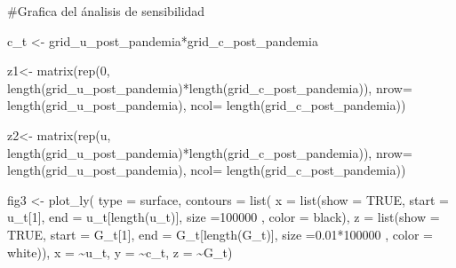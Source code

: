 \documentclass[
  us-letterpaper,
]{scrreprt}
\newenvironment{Shaded}{\begin{snugshade}}{\end{snugshade}}
\newcommand{\AttributeTok}[1]{\textcolor[rgb]{0.40,0.45,0.13}{#1}}
\newcommand{\CommentTok}[1]{\textcolor[rgb]{0.37,0.37,0.37}{#1}}
\newcommand{\ConstantTok}[1]{\textcolor[rgb]{0.56,0.35,0.01}{#1}}
\newcommand{\DecValTok}[1]{\textcolor[rgb]{0.68,0.00,0.00}{#1}}
\newcommand{\FloatTok}[1]{\textcolor[rgb]{0.68,0.00,0.00}{#1}}
\newcommand{\FunctionTok}[1]{\textcolor[rgb]{0.28,0.35,0.67}{#1}}
\newcommand{\NormalTok}[1]{\textcolor[rgb]{0.00,0.23,0.31}{#1}}
\newcommand{\OtherTok}[1]{\textcolor[rgb]{0.00,0.23,0.31}{#1}}
\newcommand{\SpecialCharTok}[1]{\textcolor[rgb]{0.37,0.37,0.37}{#1}}
\newcommand{\StringTok}[1]{\textcolor[rgb]{0.13,0.47,0.30}{#1}}
\theoremstyle{plain}
\theoremstyle{plain}
\theoremstyle{definition}
\theoremstyle{remark}
\begin{document}
\begin{Shaded}
\begin{Highlighting}[]
\CommentTok{\#Grafica del ánalisis de sensibilidad}

\NormalTok{c\_t }\OtherTok{\textless{}{-}}\NormalTok{ grid\_u\_post\_pandemia}\SpecialCharTok{*}\NormalTok{grid\_c\_post\_pandemia}

\NormalTok{z1}\OtherTok{\textless{}{-}} \FunctionTok{matrix}\NormalTok{(}\FunctionTok{rep}\NormalTok{(}\DecValTok{0}\NormalTok{,}
\FunctionTok{length}\NormalTok{(grid\_u\_post\_pandemia)}\SpecialCharTok{*}\FunctionTok{length}\NormalTok{(grid\_c\_post\_pandemia)), }\AttributeTok{nrow=}
\FunctionTok{length}\NormalTok{(grid\_u\_post\_pandemia), }\AttributeTok{ncol=} \FunctionTok{length}\NormalTok{(grid\_c\_post\_pandemia))}

\NormalTok{z2}\OtherTok{\textless{}{-}} \FunctionTok{matrix}\NormalTok{(}\FunctionTok{rep}\NormalTok{(u,}
\FunctionTok{length}\NormalTok{(grid\_u\_post\_pandemia)}\SpecialCharTok{*}\FunctionTok{length}\NormalTok{(grid\_c\_post\_pandemia)), }\AttributeTok{nrow=}
\FunctionTok{length}\NormalTok{(grid\_u\_post\_pandemia), }\AttributeTok{ncol=} \FunctionTok{length}\NormalTok{(grid\_c\_post\_pandemia))}

\NormalTok{fig3 }\OtherTok{\textless{}{-}} \FunctionTok{plot\_ly}\NormalTok{(}
  \AttributeTok{type =} \StringTok{\textquotesingle{}surface\textquotesingle{}}\NormalTok{,}
  \AttributeTok{contours =} \FunctionTok{list}\NormalTok{(}
    \AttributeTok{x =} \FunctionTok{list}\NormalTok{(}\AttributeTok{show =} \ConstantTok{TRUE}\NormalTok{, }\AttributeTok{start =}\NormalTok{ u\_t[}\DecValTok{1}\NormalTok{], }\AttributeTok{end =}
\NormalTok{u\_t[}\FunctionTok{length}\NormalTok{(u\_t)], }\AttributeTok{size =}\DecValTok{100000}\NormalTok{ ,}
\AttributeTok{color =} \StringTok{\textquotesingle{}black\textquotesingle{}}\NormalTok{),}
    \AttributeTok{z =} \FunctionTok{list}\NormalTok{(}\AttributeTok{show =} \ConstantTok{TRUE}\NormalTok{, }\AttributeTok{start =}\NormalTok{ G\_t[}\DecValTok{1}\NormalTok{], }
             \AttributeTok{end =}\NormalTok{ G\_t[}\FunctionTok{length}\NormalTok{(G\_t)], }\AttributeTok{size =}\FloatTok{0.01}\SpecialCharTok{*}\DecValTok{100000}\NormalTok{ , }
             \AttributeTok{color =} \StringTok{\textquotesingle{}white\textquotesingle{}}\NormalTok{)),}
  \AttributeTok{x =} \SpecialCharTok{\textasciitilde{}}\NormalTok{u\_t,}
  \AttributeTok{y =} \SpecialCharTok{\textasciitilde{}}\NormalTok{c\_t,}
  \AttributeTok{z =} \SpecialCharTok{\textasciitilde{}}\NormalTok{G\_t)}


\end{Highlighting}
\end{Shaded}
\end{document}
